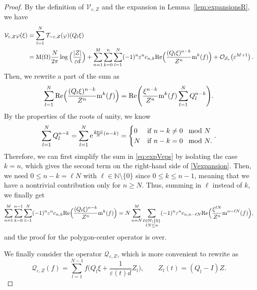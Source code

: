 \documentclass[11pt,reqno,a4paper]{amsart}
\def\eps{\varepsilon}
\def\epsilon{\varepsilon}
\def\e{{\rm e}}
\def\Re{{\rm Re}}
\newcommand{\cO}{\mathcal{O}}
\newcommand{\cQ}{\mathcal{Q}}
\newcommand{\cS}{\mathcal{S}}
\newcommand{\cT}{\mathcal{T}}
\newcommand{\cV}{\mathcal{V}}
\newcommand{\mrm}{\mathrm{m}}
\newcommand{\mrM}{\mathrm{M}}
\newcommand{\1}{\mathbbm{1}}
\theoremstyle{definition}
\theoremstyle{definition}
\numberwithin{equation}{section}
\begin{document}
\begin{proof}
By the definition of $\cV_{\eps,Z}$ and the expansion in Lemma~\ref{lem:expansionsR},  we have
\begin{align}
 \cV_{\eps,Z} \varphi(\xi)&=  \sum_{l=1}^N\cT_{-\eps,Z}(\varphi)(Q_l\xi)\\
\label{eq:expVeps}            &=\mrM(\Omega)\frac{N}{2\pi}\log\Big(\frac{|Z|}{\eps d}\Big)
  +\sum_{n=1}^M\sum_{k=0}^{n} \sum_{l=1}^N(-1)^n\eps^nc_{n,k} \Re\Big(\frac{(Q_l\xi)^{n-k}}{Z^n}{\rm m}^k(f)\Big) + \cO_{\cS_*}\bigl(\epsilon^{M+1}\bigr)\,.
    \end{align}
    Then, we rewrite a part of the sum as
    \begin{align}
\sum_{l=1}^N \Re\Big(\frac{(Q_l\xi)^{n-k}}{Z^n}{\rm m}^k(f)\Big)=\Re\Bigg(\frac{\xi^{n-k}}{Z^n}\mrm^k(f)\sum_{l=1}^NQ_l^{n-k}\Bigg).
    \end{align}
    By the properties of the roots of unity, we know 
\begin{align}
\sum_{l=1}^{N}Q_l^{n-k}=\sum_{l=1}^{N}\e^{\frac{2\pi il}{N}(n-k)}=\begin{cases}
        0  & \text{if } n-k\neq 0 \, \mod N\\
        N & \text{if } n-k= 0 \, \mod N.
    \end{cases}.
\end{align}
Therefore, we can first simplify the sum in \cref{eq:expVeps} by isolating the case $k=n$, which gives the second term on the right-hand side of \cref{Vexpansion}. Then, we need $0\leq n-k=\ell N$ with $\ell \in \mathbb{N}\setminus\{0\}$ since $0\leq k\leq n-1$, meaning that we have a nontrivial contribution only for $n\geq N$. Thus, summing in $\ell$ instead of $k$, we finally get
\begin{align}
\sum_{n=1}^M\sum_{k=0}^{n-1}\sum_{l=1}^N(-1)^n\eps^nc_{n,k}\Re\Big(\frac{(Q_l\xi)^{n-k}}{Z^n}\mrm^k(f)\Big)=N\sum_{n=N}^M\sum_{\substack{\ell \in \mathbb{N}\setminus \{0\}\\
\ell N\leq n}}(-1)^n\eps^n c_{n,n-\ell N} \Re\Big(\frac{\xi^{\ell N}}{Z^n}\mrm^{n-\ell N}(f)\Big),
\end{align}
and the proof for the polygon-center operator is over.


We finally consider the operator $\cQ_{\eps,Z}$, which is more convenient to rewrite as
\begin{equation}
\label{eq:QepsZl}
    \cQ_{\eps,Z}(f)=\sum_{l=1}^{N-1} f\big(Q_l \xi+\frac{1}{\eps(t) d}Z_l\big), \qquad Z_l(t)=(Q_l-I)Z.
\end{equation}


\end{proof}
\end{document}
